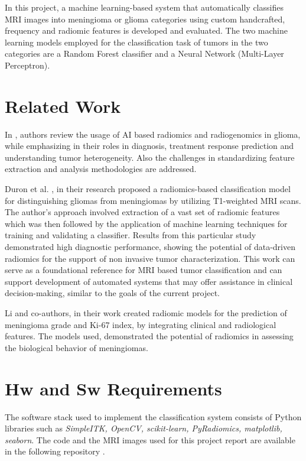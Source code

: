 \documentclass[11pt,a4paper]{article}
\begin{document}
In this project, a machine learning-based system that automatically 
classifies MRI images into meningioma or glioma categories 
using custom handcrafted, frequency and radiomic features 
is developed and evaluated.
The two machine learning models employed 
for the classification task of tumors in the two categories 
are a Random Forest classifier and 
a Neural Network (Multi-Layer Perceptron). 

\section{Related Work}

	In \cite{Fan}, authors review the usage of AI based radiomics and radiogenomics in glioma, 
	while emphasizing in their roles in diagnosis, treatment response prediction and understanding tumor heterogeneity. 
	Also the challenges in standardizing feature extraction and analysis methodologies are addressed.


	Duron et al. \cite{duron}, in their research
	proposed a radiomics-based classification model for distinguishing 
	gliomas from meningiomas by utilizing T1-weighted MRI scans. 
	The author's approach involved extraction of a vast set of radiomic features 
	which was then followed by the application of machine learning techniques for training and validating a classifier. 
	Results from this particular study demonstrated high diagnostic performance, 
	showing the potential of  data-driven radiomics for the support of
	non invasive tumor characterization. 
	This work can serve as a foundational reference for 
	MRI based tumor classification and 
	can support development of automated systems that may offer assistance
	in clinical decision-making, similar to the goals of the current project.
	
	Li and co-authors\cite{li}, in their work created radiomic models for the
	prediction of meningioma grade and Ki-67 index, 
	by integrating clinical and radiological features. 
	The models used, demonstrated the potential of radiomics in assessing 
	the biological behavior of meningiomas.

    \section{Hw and Sw Requirements}
	\par The software stack used to implement the classification system consists of Python libraries
	such as \textit{SimpleITK, OpenCV, scikit-learn, PyRadiomics, matplotlib, seaborn}.
	The code and the MRI images used for this project report are available in the following repository \cite{code}.
\end{document}
